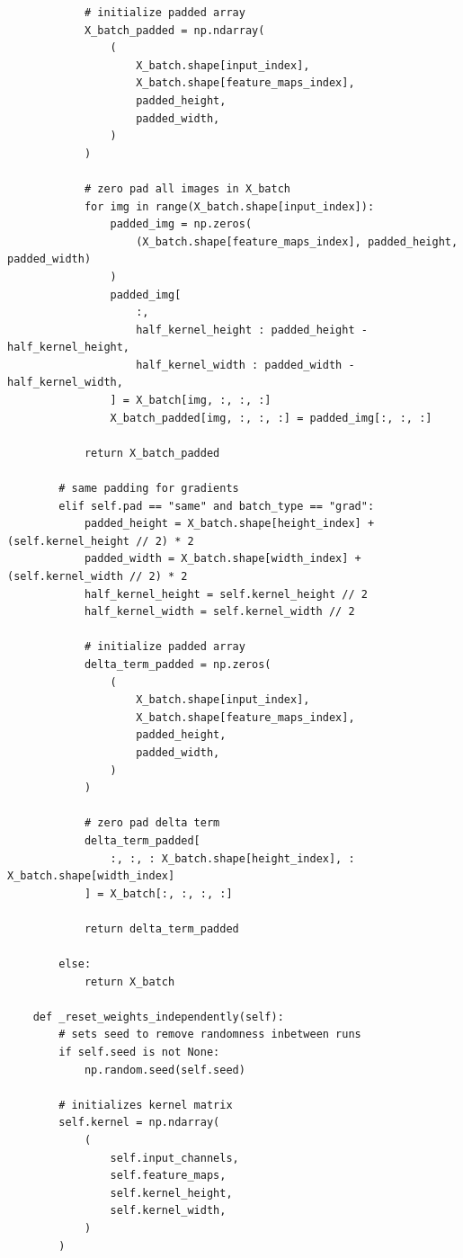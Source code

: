 \documentclass[%
oneside,                 %
final,                   %
10pt]{article}
\begin{document}
\begin{verbatim}
            # initialize padded array
            X_batch_padded = np.ndarray(
                (
                    X_batch.shape[input_index],
                    X_batch.shape[feature_maps_index],
                    padded_height,
                    padded_width,
                )
            )

            # zero pad all images in X_batch
            for img in range(X_batch.shape[input_index]):
                padded_img = np.zeros(
                    (X_batch.shape[feature_maps_index], padded_height, padded_width)
                )
                padded_img[
                    :,
                    half_kernel_height : padded_height - half_kernel_height,
                    half_kernel_width : padded_width - half_kernel_width,
                ] = X_batch[img, :, :, :]
                X_batch_padded[img, :, :, :] = padded_img[:, :, :]

            return X_batch_padded

        # same padding for gradients
        elif self.pad == "same" and batch_type == "grad":
            padded_height = X_batch.shape[height_index] + (self.kernel_height // 2) * 2
            padded_width = X_batch.shape[width_index] + (self.kernel_width // 2) * 2
            half_kernel_height = self.kernel_height // 2
            half_kernel_width = self.kernel_width // 2

            # initialize padded array
            delta_term_padded = np.zeros(
                (
                    X_batch.shape[input_index],
                    X_batch.shape[feature_maps_index],
                    padded_height,
                    padded_width,
                )
            )

            # zero pad delta term
            delta_term_padded[
                :, :, : X_batch.shape[height_index], : X_batch.shape[width_index]
            ] = X_batch[:, :, :, :]

            return delta_term_padded

        else:
            return X_batch

    def _reset_weights_independently(self):
        # sets seed to remove randomness inbetween runs
        if self.seed is not None:
            np.random.seed(self.seed)

        # initializes kernel matrix
        self.kernel = np.ndarray(
            (
                self.input_channels,
                self.feature_maps,
                self.kernel_height,
                self.kernel_width,
            )
        )


\end{verbatim}
\end{document}
